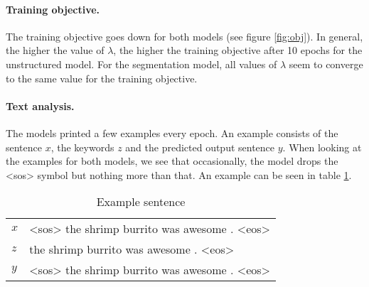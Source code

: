 \paragraph{Training objective.}
The training objective goes down for both models (see figure \ref{fig:obj}).
In general, the higher the value of $\lambda$, the higher the training objective after 10 epochs for the unstructured model.
For the segmentation model, all values of $\lambda$ seem to converge to the same value for the training objective.

\paragraph{Text analysis.}
The models printed a few examples every epoch. 
An example consists of the sentence $x$, the keywords $z$ and the predicted output sentence $y$.
When looking at the examples for both models, we see that occasionally, the model drops the <sos> symbol but nothing more than that. 
An example can be seen in table \ref{tab:examples}.

\begin{table}
    \centering
    \begin{tabular}{|ll|}
        \hline
        $x$ & <sos> the shrimp burrito was awesome . <eos>  \\
        $z$ & the shrimp burrito was awesome . <eos> \\
        $y$ & <sos> the shrimp burrito was awesome . <eos> \\
        \hline
    \end{tabular}
    \caption{Example sentence}
    \label{tab:examples}
\end{table}
